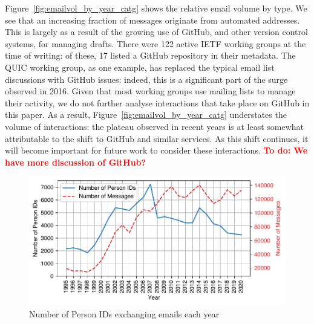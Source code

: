 \documentclass[twocolumn,10pt]{article}
\newlength{\figureWidthOneColumn}
\newcommand{\todo}[1]{\textbf{\textcolor{red}{To do: #1}}}
\begin{document}
Figure~\ref{fig:emailvol_by_year_catg} shows the relative email volume by
type. We see that an increasing fraction of messages originate from
automated addresses. This is largely as a result of the growing use of
GitHub, and other version control systems, for managing drafts. There were
122 active IETF working groups at the time of writing: of these, 17 listed
a GitHub repository in their metadata. The QUIC working group, as one
example, has replaced the typical email list discussions with GitHub
issues: indeed, this is a significant part of the surge observed in 2016.
Given that most working groups use mailing lists to manage their activity,
we do not further analyse interactions that take place on GitHub in this
paper. As a result, Figure~\ref{fig:emailvol_by_year_catg} understates the
volume of interactions: the plateau observed in recent years is at least
somewhat attributable to the shift to GitHub and similar services. As this
shift continues, it will become important for future work to consider these
interactions.
\todo{We have more discussion of GitHub?}


\begin{figure}
  \centering
  \includegraphics[width=\figureWidthOneColumn]{figures-prev/imc-2021/emails/pid_count_emailing_yearly.pdf}
  \caption{
    Number of Person IDs exchanging emails each year
  }
  \label{fig:pid_count_emailing_yearly}
\end{figure}
\end{document}
